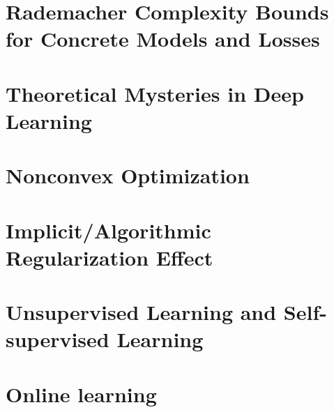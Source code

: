 \documentclass[oneside, openany]{book}
\theoremstyle{definition}
\theoremstyle{remark}
\numberwithin{section}{chapter}
\numberwithin{equation}{chapter}
\begin{document}
	\chapter{Rademacher Complexity Bounds for Concrete Models and Losses}\label{chap:gen-bounds}
	
	
	
	
	\chapter{Theoretical Mysteries in Deep Learning}
	
	
	\chapter{Nonconvex Optimization}
	
	
	
%	
	
	\chapter{Implicit/Algorithmic Regularization Effect}
	
	
	
	
	\chapter{Unsupervised Learning and Self-supervised Learning}
	
%	
	
	\chapter{Online learning}\label{chap:OL}
	
	
	
	
	\appendix
	
	
	\backmatter
	
	
	
\end{document}
